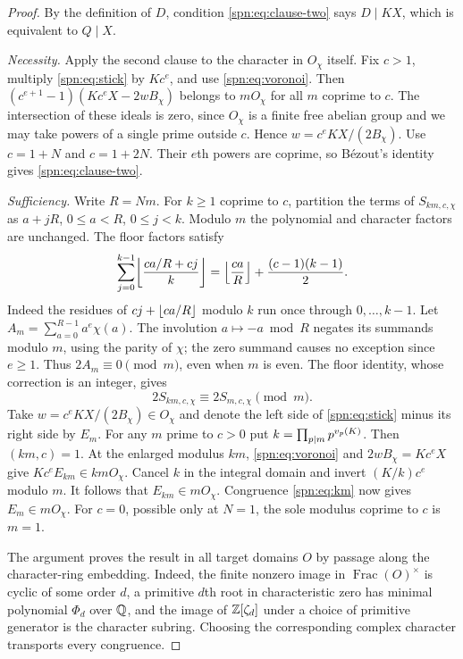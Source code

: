 \begin{proof}
By the definition of $D$, condition \eqref{spn:eq:clause-two} says $D\mid KX$,
which is equivalent to $Q\mid X$.

\emph{Necessity.} Apply the second clause to the character in $O_\chi$
itself. Fix $c>1$, multiply \eqref{spn:eq:stick} by $Kc^e$, and use
\eqref{spn:eq:voronoi}. Then $(c^{e+1}-1)(Kc^eX-2wB_\chi)$ belongs to
$mO_\chi$ for all $m$ coprime to $c$. The intersection of these ideals is
zero, since $O_\chi$ is a finite free abelian group and we may take powers of
a single prime outside $c$. Hence $w=c^eKX/(2B_\chi)$. Use $c=1+N$ and
$c=1+2N$. Their $e$th powers are coprime, so B\'ezout's identity gives
\eqref{spn:eq:clause-two}.

\emph{Sufficiency.} Write $R=Nm$. For $k\ge1$ coprime to $c$, partition the
terms of $S_{km,c,\chi}$ as $a+jR$, $0\le a<R$, $0\le j<k$. Modulo $m$ the
polynomial and character factors are unchanged. The floor factors satisfy
\[
 \sum_{j=0}^{k-1}\floor*{\frac{ca/R+cj}{k}}
 =\floor*{\frac{ca}{R}}+\frac{(c-1)(k-1)}{2}.
\]
Indeed the residues of $cj+\lfloor ca/R\rfloor$ modulo $k$ run once through
$0,\dots,k-1$. Let $A_m=\sum_{a=0}^{R-1}a^e\chi(a)$. The involution
$a\mapsto-a\bmod R$ negates its summands modulo $m$, using the parity of
$\chi$; the zero summand causes no exception since $e\ge1$. Thus
$2A_m\equiv0\pmod m$, even when $m$ is even. The floor identity, whose
correction is an integer, gives
\begin{equation}\label{spn:eq:km}
 2S_{km,c,\chi}\equiv2S_{m,c,\chi}\pmod m .
\end{equation}
Take $w=c^eKX/(2B_\chi)\in O_\chi$ and denote the left side of
\eqref{spn:eq:stick} minus its right side by $E_m$. For any $m$ prime to
$c>0$ put $k=\prod_{p\mid m}p^{v_p(K)}$. Then $(km,c)=1$. At the enlarged
modulus $km$, \eqref{spn:eq:voronoi} and $2wB_\chi=Kc^eX$ give
$Kc^eE_{km}\in kmO_\chi$. Cancel $k$ in the integral domain and invert
$(K/k)c^e$ modulo $m$. It follows that $E_{km}\in mO_\chi$. Congruence
\eqref{spn:eq:km} now gives $E_m\in mO_\chi$. For $c=0$, possible only at
$N=1$, the sole modulus coprime to $c$ is $m=1$.

The argument proves the result in all target domains $O$ by passage along
the character-ring embedding. Indeed, the finite nonzero image in
$\operatorname{Frac}(O)^\times$ is cyclic of some order $d$, a primitive
$d$th root in characteristic zero has minimal polynomial $\Phi_d$ over $\mathbb{Q}$,
and the image of $\mathbb{Z}[\zeta_d]$ under a choice of primitive generator is the
character subring. Choosing the corresponding complex character transports
every congruence.
\end{proof}

